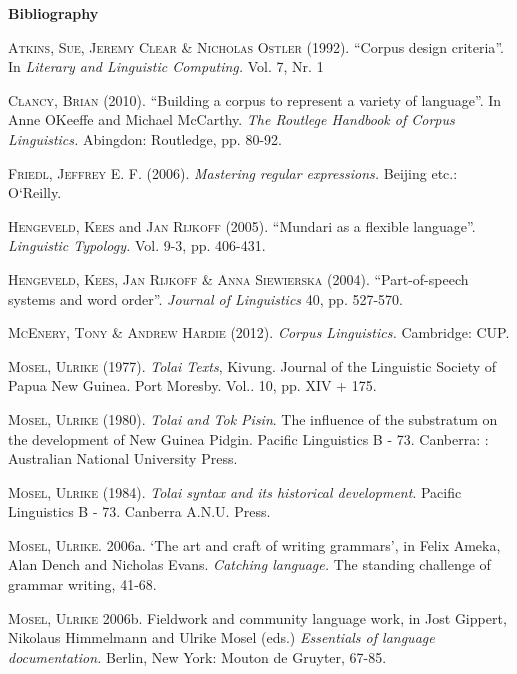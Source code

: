\documentclass[letterpaper]{article}
\title{}
\author{Ulrike}
\date{2012-05-16}
\begin{document}
\clearpage\setcounter{page}{1}\pagestyle{Standard}
{\upshape
\textbf{Bibliography}}

{\upshape
\textsc{Atkins, Sue, Jeremy Clear \& Nicholas Ostler} (1992). {\textquotedblleft}Corpus design criteria{\textquotedblright}. In \textit{Literary and Linguistic Computing. }Vol. 7, Nr. 1\textit{ }}

{\upshape
\textsc{Clancy, Brian} (2010). {\textquotedblleft}Building a corpus to represent a variety of language{\textquotedblright}. In Anne O{\textquotesingle}Keeffe and Michael McCarthy. \textit{The Routlege Handbook of Corpus Linguistics. }Abingdon: Routledge, pp. 80-92.}

{\upshape
\textsc{Friedl, Jeffrey E. F. (2006). }\textit{Mastering regular expressions. }Beijing etc.: O{\textquoteleft}Reilly.}

{\upshape
\textsc{Hengeveld, Kees }and\textsc{ Jan Rijkoff (2005). {\textquotedblleft}}Mundari as a flexible language{\textquotedblright}. \textit{Linguistic Typology. }Vol. 9-3, pp. 406-431.}

{\upshape
\textsc{Hengeveld, Kees, Jan Rijkoff \& Anna Siewierska} (2004). {\textquotedblleft}Part-of-speech systems and word order{\textquotedblright}. \textit{Journal of Linguistics} 40, pp. 527-570.}

{\upshape
\textsc{McEnery, Tony \& Andrew Hardie } (2012). \textit{Corpus Linguistics. }Cambridge: CUP.}

{\upshape
\textsc{Mosel, Ulrike} (1977). \textit{Tolai Texts}, Kivung. Journal of the\textit{ }Linguistic Society of Papua New Guinea. Port Moresby. Vol.. 10, pp. XIV + 175. }

{\upshape
\textsc{Mosel, Ulrike} (1980). \textit{Tolai and Tok Pisin}. The influence of the substratum on the development of New Guinea Pidgin. Pacific Linguistics B - 73. Canberra: : Australian National University Press.}

{\upshape
\textsc{Mosel, Ulrike} (1984). \textit{Tolai syntax and its historical development}. Pacific Linguistics B - 73. Canberra A.N.U. Press.}

{\upshape
\textsc{Mosel, Ulrike}. 2006a. {\textquoteleft}The art and craft of writing grammars{\textquoteright}, in Felix Ameka, Alan Dench and Nicholas Evans. \textit{Catching language. }The standing challenge of grammar writing, 41-68.\textit{ }}

{\upshape
\textsc{Mosel, Ulrike} 2006b. Fieldwork and community language work, in Jost Gippert, Nikolaus Himmelmann and Ulrike Mosel (eds.) \textit{Essentials of language documentation. }Berlin, New York: Mouton de Gruyter, 67-85. }
\end{document}

